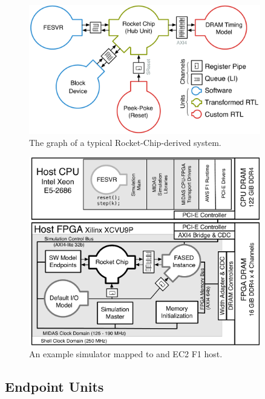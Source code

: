 \begin{figure}
    \centering
    \includegraphics[width=0.9\textwidth]{figures/rocket-target-graph.pdf}
    \caption{The graph of a typical Rocket-Chip-derived system.}
    \label{fig:rocket-target-graph}
\end{figure}

\begin{figure}
    \centering
    \includegraphics[width=0.9\textwidth]{figures/mapped-simulator-f1.pdf}
    \caption{An example simulator mapped to and EC2 F1 host.}
    \label{fig:mapped-simulator-f1}
\end{figure}


\subsection{Endpoint Units}

